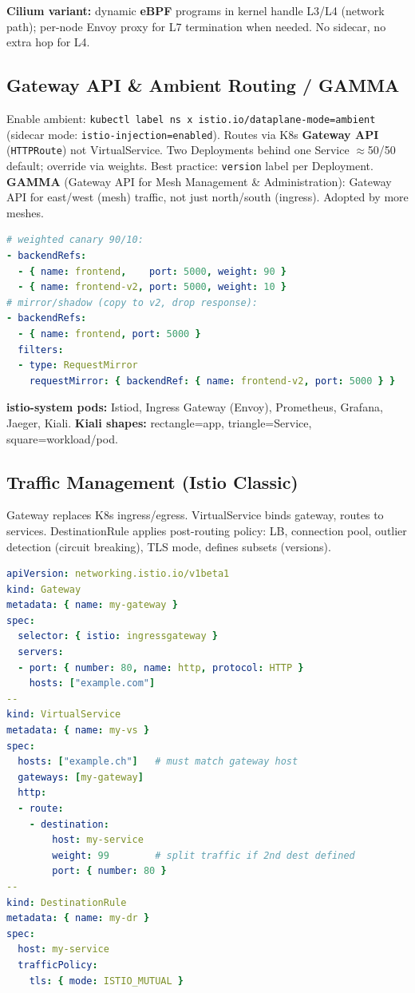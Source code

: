 \textbf{Cilium variant:} dynamic \textbf{eBPF} programs in kernel handle L3/L4 (network path); per-node Envoy proxy for L7 termination when needed. No sidecar, no extra hop for L4.

\subsection{Gateway API \& Ambient Routing / GAMMA}
Enable ambient: \texttt{kubectl label ns x istio.io/dataplane-mode=ambient} (sidecar mode: \texttt{istio-injection=enabled}). Routes via K8s \textbf{Gateway API} (\texttt{HTTPRoute}) not VirtualService. Two Deployments behind one Service $\approx$50/50 default; override via weights. Best practice: \texttt{version} label per Deployment. \\
\textbf{GAMMA} (Gateway API for Mesh Management \& Administration): Gateway API for east/west (mesh) traffic, not just north/south (ingress). Adopted by more meshes.
\begin{lstlisting}[language=yaml]
# weighted canary 90/10:
- backendRefs:
  - { name: frontend,    port: 5000, weight: 90 }
  - { name: frontend-v2, port: 5000, weight: 10 }
# mirror/shadow (copy to v2, drop response):
- backendRefs:
  - { name: frontend, port: 5000 }
  filters:
  - type: RequestMirror
    requestMirror: { backendRef: { name: frontend-v2, port: 5000 } }
\end{lstlisting}
\textbf{istio-system pods:} Istiod, Ingress Gateway (Envoy), Prometheus, Grafana, Jaeger, Kiali. \textbf{Kiali shapes:} rectangle=app, triangle=Service, square=workload/pod.

\subsection{Traffic Management (Istio Classic)}
Gateway replaces K8s ingress/egress. VirtualService binds gateway, routes to services. DestinationRule applies post-routing policy: LB, connection pool, outlier detection (circuit breaking), TLS mode, defines subsets (versions).
\begin{lstlisting}[language=yaml]
apiVersion: networking.istio.io/v1beta1
kind: Gateway
metadata: { name: my-gateway }
spec:
  selector: { istio: ingressgateway }
  servers:
  - port: { number: 80, name: http, protocol: HTTP }
    hosts: ["example.com"]
--
kind: VirtualService
metadata: { name: my-vs }
spec:
  hosts: ["example.ch"]   # must match gateway host
  gateways: [my-gateway]
  http:
  - route:
    - destination:
        host: my-service
        weight: 99        # split traffic if 2nd dest defined
        port: { number: 80 }
--
kind: DestinationRule
metadata: { name: my-dr }
spec:
  host: my-service
  trafficPolicy:
    tls: { mode: ISTIO_MUTUAL }
\end{lstlisting}

